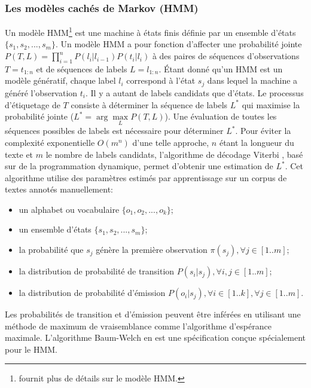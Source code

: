 \subsubsection{Les modèles cachés de Markov (HMM)}
\label{sec:structuration:litérature-HMM}
Un modèle HMM\footnote{\citet{rabiner1989tutorial} fournit plus de détails sur le modèle HMM.} est une machine à états finis définie par un ensemble d'états $ \lbrace s_1, s_2, ..., s_m \rbrace $. Un modèle HMM a pour fonction d'affecter une probabilité jointe 
$ P (T , L) = \prod\limits_{i=1}^n P(l_i \vert l_{i-1})P(t_i \vert l_i)$  à des paires de séquences d'observations $ T = t_{1: n} $ et de séquences de labels $ L = l_{1:n} $. Étant donné qu'un HMM est un modèle génératif, chaque label $l_i$ correspond à l'état $s_j$ dans lequel la machine a généré l'observation $t_i$. Il y a autant de labels candidats que d'états. Le processus d'étiquetage de $T$ consiste à déterminer la séquence de labels $ L^* $ qui maximise la probabilité jointe ($L^* = \arg \max\limits_L P(T, L)$). Une évaluation de toutes les séquences possibles de labels est nécessaire pour déterminer $L^*$. Pour éviter la complexité exponentielle $ O(m^n)$ d'une telle approche, $n$ étant la longueur du texte et $m$ le nombre de labels candidats, l'algorithme de décodage Viterbi \citep{viterbi1967viterbi}, basé sur de la  programmation dynamique, permet d'obtenir une estimation de $L^*$. Cet algorithme utilise des paramètres estimés par apprentissage sur un corpus de textes annotés manuellement:
\begin{itemize}
\item un alphabet ou vocabulaire $ \lbrace o_1, o_2, ..., o_k \rbrace $;
\item un ensemble d'états $ \lbrace s_1, s_2, ..., s_m \rbrace $;
\item la probabilité que $ s_j $ génère la première observation $ \pi(s_j), \forall j \in [1 .. m] $;
\item la distribution de probabilité de transition $ P (s_i\vert s_j),  \forall i,j \in [1 .. m] $;
\item la distribution de probabilité d'émission $ P(o_i\vert s_j), \forall i \in [1 .. k], \forall j \in [1 .. m]$.
\end{itemize}

Les probabilités de transition et d'émission peuvent être inférées en utilisant une méthode de maximum de vraisemblance comme l'algorithme d'espérance maximale. L'algorithme Baum-Welch \citep{welch2003baumwelch} en est une spécification conçue spécialement pour le HMM. 

